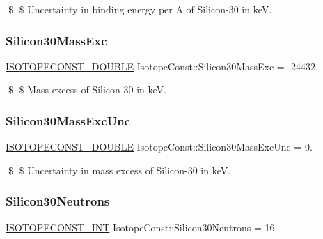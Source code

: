 \$ \$ Uncertainty in binding energy per A of Silicon-\/30 in keV. \mbox{\label{group___isotope_const-_silicon-_si30_ga330cf71a4db9d6197947f7fd6590e57d}} 
\subsubsection{\texorpdfstring{Silicon30\+Mass\+Exc}{Silicon30MassExc}}
{\footnotesize\ttfamily \mbox{\hyperlink{group___isotope_const-_macros_ga8f45a7272ce02c0b4c65c44636ed719a}{I\+S\+O\+T\+O\+P\+E\+C\+O\+N\+S\+T\+\_\+\+D\+O\+U\+B\+LE}} Isotope\+Const\+::\+Silicon30\+Mass\+Exc = -\/24432.}

\$ \$ Mass excess of Silicon-\/30 in keV. \mbox{\label{group___isotope_const-_silicon-_si30_gab287eac365e282f76fc7c5f17b6ffbda}} 
\subsubsection{\texorpdfstring{Silicon30\+Mass\+Exc\+Unc}{Silicon30MassExcUnc}}
{\footnotesize\ttfamily \mbox{\hyperlink{group___isotope_const-_macros_ga8f45a7272ce02c0b4c65c44636ed719a}{I\+S\+O\+T\+O\+P\+E\+C\+O\+N\+S\+T\+\_\+\+D\+O\+U\+B\+LE}} Isotope\+Const\+::\+Silicon30\+Mass\+Exc\+Unc = 0.}

\$ \$ Uncertainty in mass excess of Silicon-\/30 in keV. \mbox{\label{group___isotope_const-_silicon-_si30_ga5a494c87e2695bff82fe709cc00a1082}} 
\subsubsection{\texorpdfstring{Silicon30\+Neutrons}{Silicon30Neutrons}}
{\footnotesize\ttfamily \mbox{\hyperlink{group___isotope_const-_macros_ga5f18360b3e99483a35c32d789e62621c}{I\+S\+O\+T\+O\+P\+E\+C\+O\+N\+S\+T\+\_\+\+I\+NT}} Isotope\+Const\+::\+Silicon30\+Neutrons = 16}

